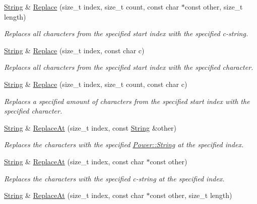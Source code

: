 \begin{DoxyCompactItemize}
\hyperlink{class_power_1_1_string}{String} \& \hyperlink{class_power_1_1_string_ab4cbd15d86f1284180bd10b418d14377}{Replace} (size\+\_\+t index, size\+\_\+t count, const char $\ast$const other, size\+\_\+t length)
\begin{DoxyCompactList}\small\item\em Replaces all characters from the specified start index with the specified c-\/string. \end{DoxyCompactList}\item 
\hyperlink{class_power_1_1_string}{String} \& \hyperlink{class_power_1_1_string_aaeba6635317522959a39eb0d2daf1bfa}{Replace} (size\+\_\+t index, const char c)
\begin{DoxyCompactList}\small\item\em Replaces all characters from the specified start index with the specified character. \end{DoxyCompactList}\item 
\hyperlink{class_power_1_1_string}{String} \& \hyperlink{class_power_1_1_string_a8bdd92abdc4f1e94ec9392aa2055c0a1}{Replace} (size\+\_\+t index, size\+\_\+t count, const char c)
\begin{DoxyCompactList}\small\item\em Replaces a specified amount of characters from the specified start index with the specified character. \end{DoxyCompactList}\item 
\hyperlink{class_power_1_1_string}{String} \& \hyperlink{class_power_1_1_string_a72ad0e1293452ac1251a6b6458669340}{Replace\+At} (size\+\_\+t index, const \hyperlink{class_power_1_1_string}{String} \&other)
\begin{DoxyCompactList}\small\item\em Replaces the characters with the specified \hyperlink{class_power_1_1_string}{Power\+::\+String} at the specified index. \end{DoxyCompactList}\item 
\hyperlink{class_power_1_1_string}{String} \& \hyperlink{class_power_1_1_string_af407db036d27c2fd06525801a6b84867}{Replace\+At} (size\+\_\+t index, const char $\ast$const other)
\begin{DoxyCompactList}\small\item\em Replaces the characters with the specified c-\/string at the specified index. \end{DoxyCompactList}\item 
\hyperlink{class_power_1_1_string}{String} \& \hyperlink{class_power_1_1_string_a4c9cc98d1582485e3e6a5487d5fec2fd}{Replace\+At} (size\+\_\+t index, const char $\ast$const other, size\+\_\+t length)

\end{DoxyCompactItemize}
